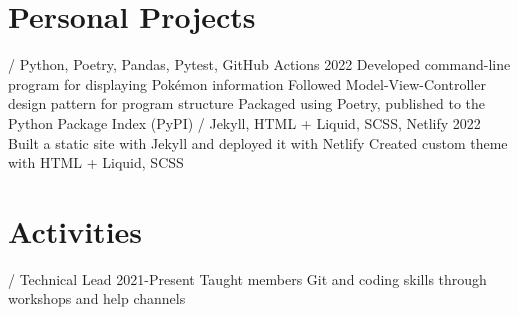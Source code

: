 \section{Personal Projects}
\begin{doutline}
    \1[Pokésummary] / Python, Poetry, Pandas, Pytest, GitHub Actions \hfill 2022
        \2 Developed command-line program for displaying Pokémon information
            \3 Followed Model-View-Controller design pattern for program structure
            \3 Packaged using Poetry, published to the Python Package Index (PyPI)
     / Jekyll, HTML + Liquid, SCSS, Netlify \hfill 2022
        \2 Built a static site with Jekyll and deployed it with Netlify
            \3 Created custom theme with HTML + Liquid, SCSS
\end{doutline}

\section{Activities}
\begin{doutline}
     / Technical Lead \hfill 2021-Present
        \2 Taught members Git and coding skills through workshops and help channels
\end{doutline}
